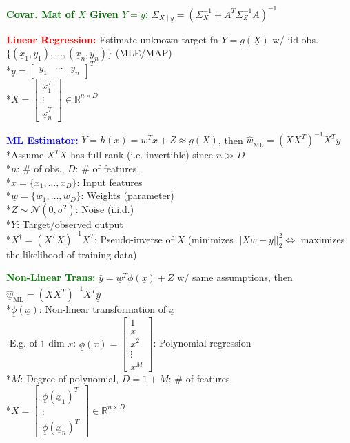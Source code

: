 \documentclass[5pt]{extarticle} %
\begin{document}
\begin{paracol}{3}
{    \textcolor{darkgreen}{\textbf{Covar. Mat of $\underline{X}$ Given $\underline{Y}=\underline{y}$:}} $\Sigma_{\underline{X} \mid \underline{y}} = \left(\Sigma_{\underline{X}}^{-1} + A^T \Sigma_{\underline{Z}}^{-1} A \right)^{-1}$

    \textcolor{red}{\textbf{Linear Regression:}} Estimate unknown target fn $Y=g(\underline{X})$ w/ iid obs. $\{(\underline{x}_1, y_1), \ldots, (\underline{x}_n, y_n)\}$ (MLE/MAP) \\ 
    *$\underline{y} = \begin{bmatrix} y_1 & \cdots & y_n \end{bmatrix}^T$ \\
    *$X = \begin{bmatrix}  \underline{x}_1^T \\ \vdots \\ \underline{x}_n^T \end{bmatrix} \in \mathbb{R}^{n \times D}$ 

    \textcolor{blue}{\textbf{ML Estimator:}} $Y = h(\underline{x}) = \underline{w}^T \underline{x} + Z \approx g(\underline{X})$, then $\hat{\underline{w}}_{\text{ML}} = (X X^T)^{-1} X^T \underline{y}$ \\
    *Assume $X^T X$ has full rank (i.e. invertible) since $n \gg D$ \\
    *$n$: \# of obs., $D$: \# of features. \\ 
    *$\underline{x}  = \{x_1, \ldots, x_D\}$: Input features \\
    *$\underline{w} = \{w_1, \ldots, w_D\}$: Weights (parameter) \\
    *$Z\sim \mathcal{N}(0, \sigma^2)$: Noise (i.i.d.) \\
    *$Y$: Target/observed output \\
    *$X^\dagger = (X^T X)^{-1} X^T$: Pseudo-inverse of $X$ (minimizes $||X \underline{w} - \underline{y}||_2^2 \iff$ maximizes the likelihood of training data) 

    \textcolor{green}{\textbf{Non-Linear Trans:}} $\hat{y} = \underline{w}^T \underline{\phi}(\underline{x}) + Z$ w/ same assumptions, then $\hat{\underline{w}}_{\text{ML}} = (X X^T)^{-1} X^T \underline{y}$ \\
    *$\underline{\phi}(\underline{x})$: Non-linear transformation of $\underline{x}$ \\
    -E.g. of $1$ dim $x$: $\underline{\phi}(x) = \begin{bmatrix} 1 \\ x \\ x^2 \\ \vdots \\ x^M \end{bmatrix}$: Polynomial regression \\ 
    *$M$: Degree of polynomial, $D=1+M$: \# of features. \\
    *$X = \begin{bmatrix}  \underline{\phi}(\underline{x}_1)^T \\ \vdots \\ \underline{\phi}(\underline{x}_n)^T \end{bmatrix} \in \mathbb{R}^{n \times D}$
    
}
\end{paracol}
\end{document}
